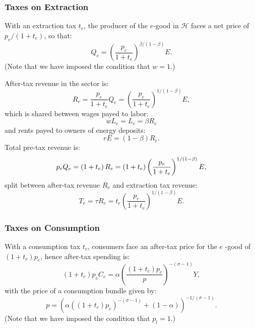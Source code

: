\documentclass[notitlepage,12pt]{article}
\begin{document}
\subsubsection{Taxes on Extraction}

With an extraction tax $t_{e}$, the producer of the $e$-good in $\mathcal{H}$
faces a net price of $p_{e}/(1+t_{e})$, so that:%
\begin{equation*}
Q_{e}=\left( \frac{p_{e}}{1+t_{e}}\right) ^{\beta /(1-\beta )}E.
\end{equation*}%
(Note that we have imposed the condition that $w=1$.)

After-tax revenue in the sector is:%
\begin{equation*}
R_{e}=\frac{p_{e}}{1+t_{e}}Q_{e}=\left( \frac{p_{e}}{1+t_{e}}\right)
^{1/(1-\beta )}E,
\end{equation*}%
which is shared between wages payed to labor:%
\begin{equation*}
wL_{e}=L_{e}=\beta R_{e}
\end{equation*}%
and rents payed to owners of energy deposits:%
\begin{equation*}
rE=\left( 1-\beta \right) R_{e}.
\end{equation*}%
Total pre-tax revenue is:%
\begin{equation*}
p_{e}Q_{e}=\left( 1+t_{e}\right) R_{e}=\left( 1+t_{e}\right) \left( \frac{%
p_{e}}{1+t_{e}}\right) ^{1/(1-\beta )}E,
\end{equation*}%
split between after-tax revenue $R_{e}$ and extraction tax revenue:%
\begin{equation*}
T_{e}=\tau R_{e}=t_{e}\left( \frac{p_{e}}{1+t_{e}}\right) ^{1/(1-\beta )}E.
\end{equation*}

\subsubsection{Taxes on Consumption}

With a consumption tax $t_{c}$, consumers face an after-tax price for the $e$%
-good of $(1+t_{c})p_{e}$, hence after-tax spending is:%
\begin{equation*}
(1+t_{c})p_{e}C_{e}=\alpha \left( \frac{(1+t_{c})p_{e}}{p}\right) ^{-(\sigma
-1)}Y,
\end{equation*}%
with the price of a consumption bundle given by:%
\begin{equation}
p=\left( \alpha \left( (1+t_{c})p_{e}\right) ^{-(\sigma -1)}+(1-\alpha
)\right) ^{-1/(\sigma -1)}.  \label{price index with tax}
\end{equation}%
(Note that we have imposed the condition that $p_{l}=1$.)
\end{document}
